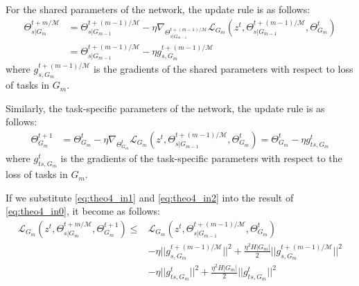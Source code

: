 For the shared parameters of the network, the update rule is as follows:
\begin{align}
    \Theta_{s|G_m}^{t+m/\mathcal{M}} &= \Theta_{s|G_{m-1}}^{t+(m-1)/\mathcal{M}} - \eta \nabla_{\Theta_{s|G_{m-1}}^{t+(m-1)/\mathcal{M}}} \mathcal{L}_{G_m}(z^t, \Theta_{s|G_{m-1}}^{t+(m-1)/\mathcal{M}}, \Theta_{G_m}^t)\\
    &= \Theta_{s|G_{m-1}}^{t+(m-1)/\mathcal{M}} - \eta g_{s, G_m}^{t+(m-1)/\mathcal{M}}
    \label{eq:theo4_in1}
\end{align}
where $g_{s, G_m}^{t+(m-1)/\mathcal{M}}$ is the gradients of the shared parameters with respect to loss of tasks in $G_m$.

Similarly, the task-specific parameters of the network, the update rule is as follows:
\begin{align}
    \Theta_{G_m}^{t+1} &= \Theta_{G_m}^{t} - \eta \nabla_{\Theta_{G_m}^{t}} \mathcal{L}_{G_m}(z^t, \Theta_{s|G_{m-1}}^{t+(m-1)/\mathcal{M}}, \Theta_{G_m}^t) = \Theta_{G_m}^t - \eta g_{ts, G_m}^{t}
    \label{eq:theo4_in2}
\end{align}
where $g_{ts, G_m}^t$ is the gradients of the task-specific parameters with respect to the loss of tasks in $G_m$.

If we substitute \cref{eq:theo4_in1} and \cref {eq:theo4_in2} into the result of \cref{eq:theo4_in0}, it become as follows:
\begin{align}
    \mathcal{L}_{G_m} (z^t, \Theta_{s|G_m}^{t+m/\mathcal{M}}, \Theta_{G_m}^{t+1}) \leq& \mathcal{L}_{G_m} (z^t, \Theta_{s|G_{m-1}}^{t+(m-1)/\mathcal{M}}, \Theta_{G_m}^t)\\
    &- \eta ||g_{s, G_m}^{t+(m-1)/\mathcal{M}}||^2  + \frac{\eta^2 H|G_m|}{2}||g_{s, G_m}^{t+(m-1)/\mathcal{M}}||^2 \\
    &- \eta ||g_{ts, G_m}^t||^2  + \frac{\eta^2 H|G_m|}{2}||g_{ts, G_m}^t||^2
\end{align}

